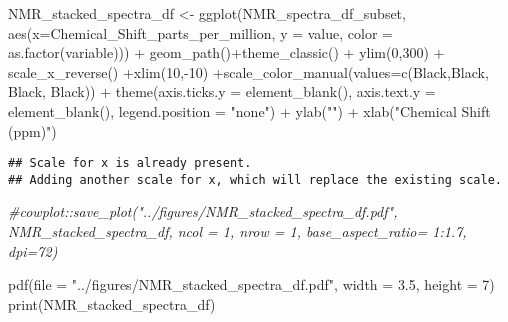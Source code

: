 \documentclass[
]{article}
\newenvironment{Shaded}{\begin{snugshade}}{\end{snugshade}}
\newcommand{\AttributeTok}[1]{\textcolor[rgb]{0.77,0.63,0.00}{#1}}
\newcommand{\CommentTok}[1]{\textcolor[rgb]{0.56,0.35,0.01}{\textit{#1}}}
\newcommand{\DecValTok}[1]{\textcolor[rgb]{0.00,0.00,0.81}{#1}}
\newcommand{\FloatTok}[1]{\textcolor[rgb]{0.00,0.00,0.81}{#1}}
\newcommand{\FunctionTok}[1]{\textcolor[rgb]{0.00,0.00,0.00}{#1}}
\newcommand{\NormalTok}[1]{#1}
\newcommand{\OtherTok}[1]{\textcolor[rgb]{0.56,0.35,0.01}{#1}}
\newcommand{\SpecialCharTok}[1]{\textcolor[rgb]{0.00,0.00,0.00}{#1}}
\newcommand{\StringTok}[1]{\textcolor[rgb]{0.31,0.60,0.02}{#1}}
\begin{document}
\begin{Shaded}
\begin{Highlighting}[]
\NormalTok{NMR\_stacked\_spectra\_df }\OtherTok{\textless{}{-}} \FunctionTok{ggplot}\NormalTok{(NMR\_spectra\_df\_subset, }\FunctionTok{aes}\NormalTok{(}\AttributeTok{x=}\NormalTok{Chemical\_Shift\_parts\_per\_million, }\AttributeTok{y =}\NormalTok{ value, }\AttributeTok{color =} \FunctionTok{as.factor}\NormalTok{(variable))) }\SpecialCharTok{+} \FunctionTok{geom\_path}\NormalTok{()}\SpecialCharTok{+}\FunctionTok{theme\_classic}\NormalTok{() }\SpecialCharTok{+} \FunctionTok{ylim}\NormalTok{(}\DecValTok{0}\NormalTok{,}\DecValTok{300}\NormalTok{) }\SpecialCharTok{+} \FunctionTok{scale\_x\_reverse}\NormalTok{() }\SpecialCharTok{+}\FunctionTok{xlim}\NormalTok{(}\DecValTok{10}\NormalTok{,}\SpecialCharTok{{-}}\DecValTok{10}\NormalTok{) }\SpecialCharTok{+}\FunctionTok{scale\_color\_manual}\NormalTok{(}\AttributeTok{values=}\FunctionTok{c}\NormalTok{(}\StringTok{\textquotesingle{}Black\textquotesingle{}}\NormalTok{,}\StringTok{\textquotesingle{}Black\textquotesingle{}}\NormalTok{, }\StringTok{\textquotesingle{}Black\textquotesingle{}}\NormalTok{, }\StringTok{\textquotesingle{}Black\textquotesingle{}}\NormalTok{)) }\SpecialCharTok{+} \FunctionTok{theme}\NormalTok{(}\AttributeTok{axis.ticks.y =} \FunctionTok{element\_blank}\NormalTok{(),  }\AttributeTok{axis.text.y =} \FunctionTok{element\_blank}\NormalTok{(), }\AttributeTok{legend.position =} \StringTok{"none"}\NormalTok{)  }\SpecialCharTok{+} \FunctionTok{ylab}\NormalTok{(}\StringTok{""}\NormalTok{) }\SpecialCharTok{+} \FunctionTok{xlab}\NormalTok{(}\StringTok{"Chemical Shift (ppm)"}\NormalTok{)}
\end{Highlighting}
\end{Shaded}

\begin{verbatim}
## Scale for x is already present.
## Adding another scale for x, which will replace the existing scale.
\end{verbatim}

\begin{Shaded}
\begin{Highlighting}[]
\CommentTok{\#cowplot::save\_plot("../figures/NMR\_stacked\_spectra\_df.pdf", NMR\_stacked\_spectra\_df, ncol = 1, nrow = 1, base\_aspect\_ratio= 1:1.7, dpi=72)}

\FunctionTok{pdf}\NormalTok{(}\AttributeTok{file =} \StringTok{"../figures/NMR\_stacked\_spectra\_df.pdf"}\NormalTok{, }\AttributeTok{width =} \FloatTok{3.5}\NormalTok{, }\AttributeTok{height =} \DecValTok{7}\NormalTok{) }
\FunctionTok{print}\NormalTok{(NMR\_stacked\_spectra\_df)}
\end{Highlighting}
\end{Shaded}
\end{document}
